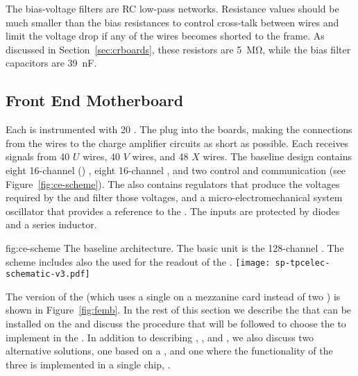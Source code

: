 The bias-voltage filters are RC low-pass networks. Resistance 
values should be much smaller than the bias resistances to control 
cross-talk between wires and limit the voltage drop if any of the 
wires becomes shorted to the  frame. As discussed
in Section~\ref{sec:crboards}, these resistors are 
\SI{5}{\mega\ohm}, while the bias filter capacitors are \SI{39}{nF}.

\subsection{Front End Motherboard}
\label{sec:fdsp-tpcelec-design-femb}

Each  is instrumented with \num{20} .
The  plug into the   boards, 
making the connections from the wires to the charge amplifier 
circuits as short as possible. Each  receives signals 
from \num{40} $U$ wires, \num{40} $V$ wires, and \num{48} $X$ wires.
The baseline  design contains eight \num{16}-channel 
 () , eight \num{16}-channel 
 , and two  control and 
communication  (see Figure~\ref{fig:ce-scheme}).
The  also contains regulators that produce the voltages 
required by the  and filter those voltages, and 
a micro-electromechanical system oscillator that provides
a reference to the  .
The  inputs are protected by diodes and a series inductor.

\begin{dunefigure}
{fig:ce-scheme}
{The baseline  architecture. The basic unit is the 
128-channel . The scheme includes also the 
 used for the readout of the .}
\texttt{[image: sp-tpcelec-schematic-v3.pdf]}
\end{dunefigure}

The  version of the  (which uses a single 
 on a mezzanine card instead of two  
) is shown in Figure~\ref{fig:femb}. In the rest of
this section we describe the  that can be installed
on the  and discuss the procedure that will be 
followed to choose the  %
to implement in the %
. %
In addition to
describing , , and ,
we also discuss two alternative solutions, one based on a 
 , and one where the functionality of the
three  is implemented in a single chip, .

